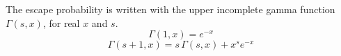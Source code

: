 \documentclass{article}
\begin{document}
The escape probability is written with the upper incomplete gamma function $\Gamma(s,x)$, for real $x$ and $s$.
\begin{equation}
\Gamma(1,x) = e^{-x}
\label{eq:ig1}
\end{equation}
\begin{equation}
\Gamma(s+1,x) = s\,\Gamma(s,x) + x^{s} e^{-x}
\label{eq:ig2}
\end{equation}
\end{document}

